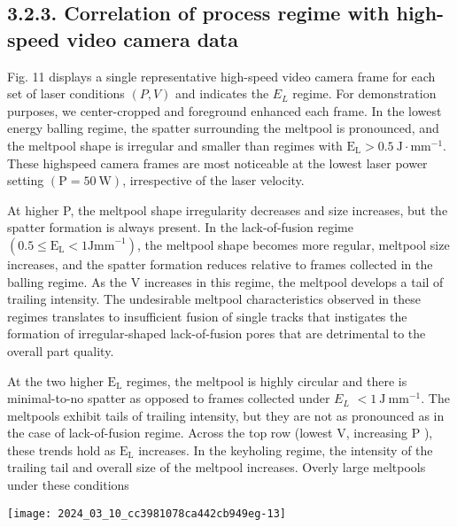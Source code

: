 \documentclass[10pt]{article}
\begin{document}
\subsection*{3.2.3. Correlation of process regime with high-speed video camera data}
Fig. 11 displays a single representative high-speed video camera frame for each set of laser conditions $(P, V)$ and indicates the $E_{L}$ regime. For demonstration purposes, we center-cropped and foreground enhanced each frame. In the lowest energy balling regime, the spatter surrounding the meltpool is pronounced, and the meltpool shape is irregular and smaller than regimes with $\mathrm{E}_{\mathrm{L}}>0.5 \mathrm{~J} \cdot \mathrm{mm}^{-1}$. These highspeed camera frames are most noticeable at the lowest laser power setting $(\mathrm{P}=50 \mathrm{~W})$, irrespective of the laser velocity.

At higher P, the meltpool shape irregularity decreases and size increases, but the spatter formation is always present. In the lack-of-fusion regime $\left(0.5 \leq \mathrm{E}_{\mathrm{L}}<1 \mathrm{Jmm}^{-1}\right)$, the meltpool shape becomes more regular, meltpool size increases, and the spatter formation reduces relative to frames collected in the balling regime. As the V increases in this regime, the meltpool develops a tail of trailing intensity. The undesirable meltpool characteristics observed in these regimes translates to insufficient fusion of single tracks that instigates the formation of irregular-shaped lack-of-fusion pores that are detrimental to the overall part quality.

At the two higher $\mathrm{E}_{\mathrm{L}}$ regimes, the meltpool is highly circular and there is minimal-to-no spatter as opposed to frames collected under $E_{L}$ $<1 \mathrm{~J} \mathrm{~mm}^{-1}$. The meltpools exhibit tails of trailing intensity, but they are not as pronounced as in the case of lack-of-fusion regime. Across the top row (lowest $\mathrm{V}$, increasing $\mathrm{P}$ ), these trends hold as $\mathrm{E}_{\mathrm{L}}$ increases. In the keyholing regime, the intensity of the trailing tail and overall size of the meltpool increases. Overly large meltpools under these conditions

\begin{center}
\texttt{[image: 2024\_03\_10\_cc3981078ca442cb949eg-13]}
\end{center}
\end{document}
